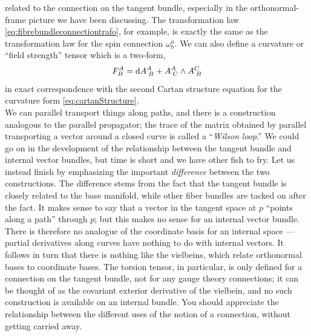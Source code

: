 related to the connection on the tangent bundle, especially in the orthonormal-frame picture
we have been discussing. The transformation law \ref{eq:fibrebundleconnectiontrafo}, for example, is exactly the same
as the transformation law for the spin connection $\omega^a_b$. We can also define a curvature or
“field strength” tensor which is a two-form,
\begin{equation}
F^A_B = \mathrm{d} A^A_{\;B} + A^A_{\;C} \wedge A^C_{\;B}
\end{equation}
in exact correspondence with the second Cartan structure equation for the curvature form \ref{eq:cartanStructure}.\\
We can parallel transport things along paths, and
there is a construction analogous to the parallel propagator; the trace of the matrix obtained
by parallel transporting a vector around a closed curve is called a “\emph{Wilson loop}.”
We could go on in the development of the relationship between the tangent bundle and
internal vector bundles, but time is short and we have other fish to fry. Let us instead finish
by emphasizing the important \emph{difference} between the two constructions. The difference
stems from the fact that the tangent bundle is closely related to the base manifold, while
other fiber bundles are tacked on after the fact. It makes sense to say that a vector in the
tangent space at $p$ “points along a path” through $p$; but this makes no sense for an internal
vector bundle. There is therefore no analogue of the coordinate basis for an internal space —
partial derivatives along curves have nothing to do with internal vectors. It follows in turn
that there is nothing like the vielbeins, which relate orthonormal bases to coordinate bases.
The torsion tensor, in particular, is only defined for a connection on the tangent bundle, not
for any gauge theory connections; it can be thought of as the covariant exterior derivative
of the vielbein, and no such construction is available on an internal bundle. You should
appreciate the relationship between the different uses of the notion of a connection, without
getting carried away.









































